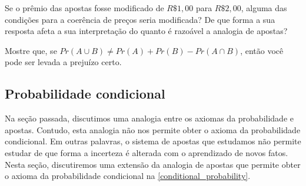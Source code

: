 \begin{exercise}
 Se o prêmio das apostas fosse modificado de 
 $R\$1,00$ para $R\$2,00$, 
 alguma das condições para 
 a coerência de preços seria modificada?
 De que forma a sua resposta afeta a 
 sua interpretação do quanto é razoável 
 a analogia de apostas?
\end{exercise}


\begin{exercise}
 Mostre que, se 
 $Pr(A \cup B) \neq Pr(A) + Pr(B) - Pr(A \cap B)$,
 então você pode ser levada a prejuízo certo.
\end{exercise}

\subsection{Probabilidade condicional}

Na seção passada, 
discutimos uma analogia entre
os axiomas da probabilidade e apostas.
Contudo, esta analogia não nos permite obter
o axioma da probabilidade condicional.
Em outras palavras, o sistema de apostas
que estudamos não permite estudar de que
forma a incerteza é alterada com o aprendizado
de novos fatos.
Nesta seção, discutiremos uma extensão
da analogia de apostas que permite obter
o axioma da probabilidade condicional na \cref{conditional_probability}.

